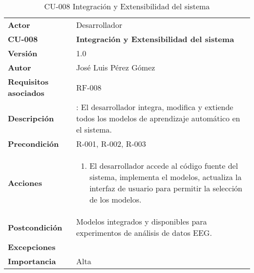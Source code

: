 \begin{table}[p]
	\centering
	\begin{tabularx}{\linewidth}{ p{} p{} }
		\toprule
		\textbf{Actor}              & Desarrollador    \\
		\textbf{CU-008}    & \textbf{Integración y Extensibilidad del sistema}\\
		\toprule
		\textbf{Versión}              & 1.0    \\
		\textbf{Autor}                & José Luis Pérez Gómez \\
		\textbf{Requisitos asociados} & RF-008 \\
		\textbf{Descripción}          & : El desarrollador integra, modifica y extiende todos los modelos de aprendizaje automático en el sistema.\\
		\textbf{Precondición}         & R-001, R-002, R-003\\
		\textbf{Acciones}             &
		\begin{enumerate}
			\def\labelenumi{\arabic{enumi}.}
			\tightlist
			\item El desarrollador accede al código fuente del sistema, implementa el modelos,  actualiza la interfaz de usuario para permitir la selección de los modelos.
			
		\end{enumerate}\\
		\textbf{Postcondición}        & Modelos integrados y disponibles para experimentos de análisis de datos EEG.\\
		\textbf{Excepciones}          &  \\
		\textbf{Importancia}          & Alta \\
		\bottomrule
	\end{tabularx}
	\caption{CU-008 Integración y Extensibilidad del sistema}
\end{table}


